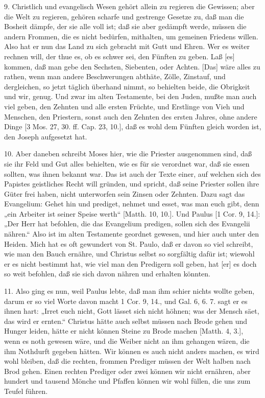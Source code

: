9. Christlich und evangelisch Wesen gehört allein zu regieren die Gewissen; aber die Welt zu regieren, gehören scharfe und gestrenge Gesetze zu, daß man die Bosheit dämpfe, der sie alle voll ist; daß sie aber gedämpft werde, müssen die andern Frommen, die es nicht bedürfen, mithalten, um gemeinen Friedens willen. Also hat er nun das Land zu sich gebracht mit Gutt und Ehren. Wer es weiter rechnen will, der thue es, ob es schwer sei, den Fünften zu geben. Laß [es] kommen, daß man gebe den Sechsten, Siebenten, oder Achten. [Das] wäre alles zu rathen, wenn man andere Beschwerungen abthäte, Zölle, Zinstauf, und dergleichen, so jetzt täglich überhand nimmt, so behielten beide, die Obrigkeit und wir, genug. Und zwar im alten Testamente, bei den Juden, mußte man auch viel geben, den Zehnten und alle ersten Früchte, und Erstlinge von Vieh und Menschen, den Priestern, sonst auch den Zehnten des ersten Jahres, ohne andere Dinge [3 Mos. 27, 30. ff. Cap. 23, 10.], daß es wohl dem Fünften gleich worden ist, den Joseph aufgesetzt hat.

10. Aber daneben schreibt Moses hier, wie die Priester ausgenommen sind, daß sie ihr Feld und Gut alles behielten, wie es für sie verordnet war, daß sie essen sollten, was ihnen bekannt war. Das ist auch der Texte einer, auf welchen sich des Papistes geistliches Recht will gründen, und spricht, daß seine Priester sollen ihre Güter frei haben, nicht unterworfen sein Zinsen oder Zehnten. Dazu sagt das Evangelium: Gehet hin und prediget, nehmet und esset, was man euch gibt, denn „ein Arbeiter ist seiner Speise werth“ [Matth. 10, 10.]. Und Paulus [1 Cor. 9, 14.]: „Der Herr hat befohlen, die das Evangelium predigen, sollen sich des Evangelii nähren.“ Also ist im alten Testamente geordnet gewesen, und hier auch unter den Heiden. Mich hat es oft gewundert von St. Paulo, daß er davon so viel schreibt, wie man den Bauch ernähre, und Christus selbst so sorgfältig dafür ist; wiewohl er es nicht bestimmt hat, wie viel man den Predigern soll geben, hat [er] es doch so weit befohlen, daß sie sich davon nähren und erhalten könnten.

11. Also ging es nun, weil Paulus lebte, daß man ihm schier nichts wollte geben, darum er so viel Worte davon macht 1 Cor. 9, 14., und Gal. 6, 6. 7. sagt er es ihnen hart: „Irret euch nicht, Gott lässet sich nicht höhnen; was der Mensch säet, das wird er ernten.“ Christus hätte auch selbst müssen nach Brode gehen und Hunger leiden, hätte er nicht können Steine zu Brode machen [Matth. 4, 3.], wenn es noth gewesen wäre, und die Weiber nicht an ihm gehangen wären, die ihm Nothdurft gegeben hätten. Wir können es auch nicht anders machen, es wird wohl bleiben, daß die rechten, frommen Prediger müssen der Welt halben nach Brod gehen. Einen rechten Prediger oder zwei können wir nicht ernähren, aber hundert und tausend Mönche und Pfaffen können wir wohl füllen, die uns zum Teufel führen.

